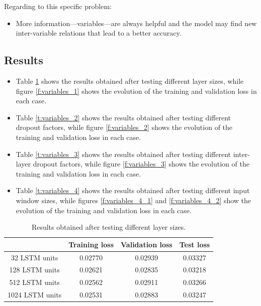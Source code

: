 \documentclass[]{article}
\begin{document}
	Regarding to this specific problem:
	
	\begin{itemize}
		\item More information---variables---are always helpful and the model may find new inter-variable relations that lead to a better accuracy.
	\end{itemize}
	
	\subsection{Results}
	
	\begin{itemize}
		\item Table \ref{t:variables_1} shows the results obtained after testing different layer sizes, while figure \ref{f:variables_1} shows the evolution of the training and validation loss in each case.
		
		\item Table \ref{t:variables_2} shows the results obtained after testing different dropout factors, while figure \ref{f:variables_2} shows the evolution of the training and validation loss in each case.
		
		\item Table \ref{t:variables_3} shows the results obtained after testing different inter-layer dropout factors, while figure \ref{f:variables_3} shows the evolution of the training and validation loss in each case.
		
		\item Table \ref{t:variables_4} shows the results obtained after testing different input window sizes, while figures \ref{f:variables_4_1} and \ref{f:variables_4_2} show the evolution of the training and validation loss in each case.
	\end{itemize}
	
	\begin{table}[H]
		\centering
		\begin{tabular}{@{}cccc@{}}
			\toprule
			& Training loss & Validation loss & Test loss \\ \midrule
			32 LSTM units   & 0.02770       & 0.02939         & 0.03327   \\
			128 LSTM units  & 0.02621       & 0.02835         & 0.03218   \\
			512 LSTM units  & 0.02562       & 0.02911         & 0.03266   \\
			1024 LSTM units & 0.02531       & 0.02883         & 0.03247   \\ \bottomrule
		\end{tabular}
		\caption{Results obtained after testing different layer sizes.}
		\label{t:variables_1}
	\end{table}
	
\end{document}
